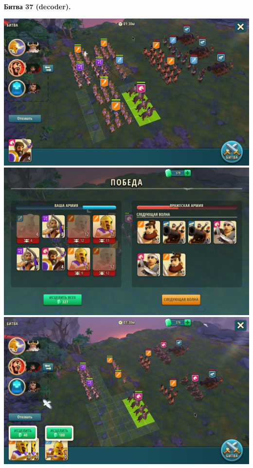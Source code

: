 \newpage
\begin{center}
	\hypertarget{fight37}{\textbf{Битва 37 (decoder).}}
\end{center}
\noindent\includegraphics[width=\linewidth]{./parts/media/TreasureHunt/37/decoder/photo_2022-04-14_12-36-24.jpg} \newline
\noindent\includegraphics[width=\linewidth]{./parts/media/TreasureHunt/37/decoder/photo_2022-04-14_12-36-38.jpg} \newline
\noindent\includegraphics[width=\linewidth]{./parts/media/TreasureHunt/37/decoder/photo_2022-04-14_12-36-42.jpg} \newline
